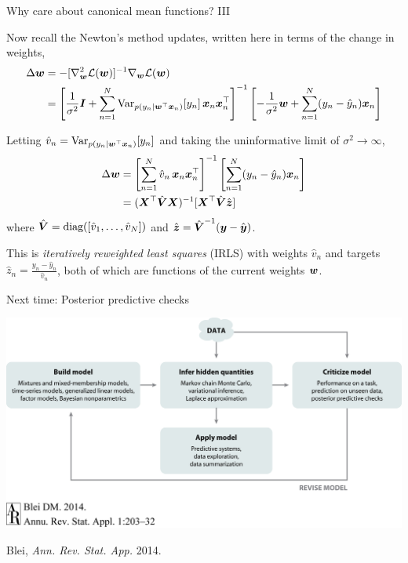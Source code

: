 \documentclass[aspectratio=169]{beamer}
\begin{document}
\begin{frame}{Why care about canonical mean functions? III}

Now recall the Newton's method updates, written here in terms of the change in weights,
\begin{align}
    \Delta \boldsymbol{w} &= - [\nabla_{\boldsymbol{w}}^2 \mathcal{L}(\boldsymbol{w})]^{-1} \nabla_{\boldsymbol{w}} \mathcal{L}(\boldsymbol{w}) \\
    &= \left[\frac{1}{\sigma^2}\boldsymbol{I} + \sum_{n=1}^N \mathrm{Var}_{p(y_n | \boldsymbol{w}^\top \boldsymbol{x}_n)}[y_n] \, \boldsymbol{x}_n \boldsymbol{x}_n^\top \right]^{-1} \left[ -\frac{1}{\sigma^2}\boldsymbol{w} + \sum_{n=1}^N (y_n - \hat{y}_n) \boldsymbol{x}_n \right]
\end{align}

Letting $\hat{v}_n = \mathrm{Var}_{p(y_n | \boldsymbol{w}^\top \boldsymbol{x}_n)}[y_n]$ and taking the uninformative limit of $\sigma^2 \to \infty$, 
\begin{align}
    \Delta \boldsymbol{w} &=
    \left[\sum_{n=1}^N \hat{v}_n \, \boldsymbol{x}_n \boldsymbol{x}_n^\top \right]^{-1} \left[ \sum_{n=1}^N (y_n - \hat{y}_n) \boldsymbol{x}_n \right] \\
    &= (\boldsymbol{X}^\top \hat{\boldsymbol{V}} \boldsymbol{X})^{-1} [\boldsymbol{X}^\top \hat{\boldsymbol{V}} \hat{\boldsymbol{z}}]
\end{align}
where $\hat{\boldsymbol{V}} = \textrm{diag}([\hat{v}_1, \ldots, \hat{v}_N])$ and $\hat{\boldsymbol{z}} = \hat{\boldsymbol{V}}^{-1} (\boldsymbol{y} - \hat{\boldsymbol{y}})$. 

This is \emph{iteratively reweighted least squares} (IRLS) with weights $\hat{v}_n$ and targets $\hat{z}_n = \frac{y_n - \hat{y}_n}{\hat{v}_n}$, both of which are functions of the current weights $\boldsymbol{w}$.
\end{frame}

\begin{frame}{Next time: Posterior predictive checks}
\begin{center}
\includegraphics[width=.85\linewidth]{figures/lap1/boxsloop.jpeg}\\
\end{center} 
\begin{flushright}
{\footnotesize Blei, \textit{Ann. Rev. Stat. App.} 2014.}
\end{flushright}
\end{frame}
\end{document}
